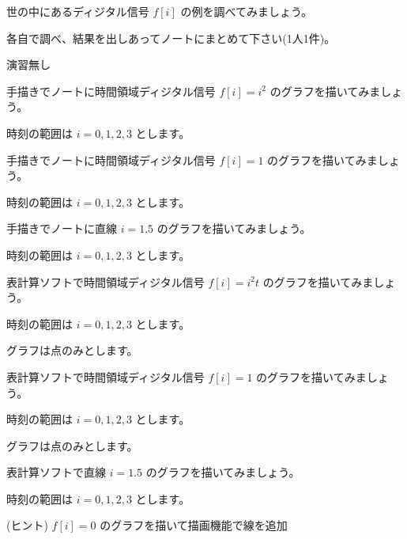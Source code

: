 \documentclass[a4paper]{jarticle}
\begin{document}


 世の中にあるディジタル信号 $f[i]$ の例を調べてみましょう。\par
\noindent 各自で調べ、結果を出しあってノートにまとめて下さい(1人1件)。


\vspace{2zh}
\noindent 演習無し


 手描きでノートに時間領域ディジタル信号 $f[i] = i^2$ のグラフを描いてみましょう。\par
\noindent 時刻の範囲は $i = 0,1,2,3$ とします。

 手描きでノートに時間領域ディジタル信号 $f[i] = 1$ のグラフを描いてみましょう。\par
\noindent 時刻の範囲は $i = 0,1,2,3$ とします。

 手描きでノートに直線 $i = 1.5$ のグラフを描いてみましょう。\par
\noindent 時刻の範囲は $i = 0,1,2,3$ とします。

 表計算ソフトで時間領域ディジタル信号 $f[i] = i^2t$ のグラフを描いてみましょう。\par
\noindent 時刻の範囲は $i = 0,1,2,3$ とします。\par
\noindent グラフは点のみとします。

 表計算ソフトで時間領域ディジタル信号 $f[i] = 1$ のグラフを描いてみましょう。\par
\noindent 時刻の範囲は $i = 0,1,2,3$ とします。\par
\noindent グラフは点のみとします。

 表計算ソフトで直線 $i = 1.5$ のグラフを描いてみましょう。\par
\noindent 時刻の範囲は $i = 0,1,2,3$ とします。\par
\noindent (ヒント) $f[i] = 0$ のグラフを描いて描画機能で線を追加

\savepractime
\end{document}
